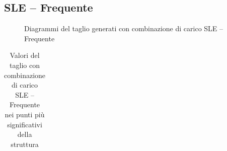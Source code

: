 \begin{landscape}
\subsection*{SLE -- Frequente}
\begin{figure}[H]
\centering
{} 
\caption{Diagrammi del taglio generati con combinazione di carico SLE -- Frequente}
\label{fig:Tagli_SLSfrequent}
\end{figure}
\begin{table}[H]
\centering
\caption{Valori del taglio con combinazione di carico SLE -- Frequente nei punti più significativi della struttura}
	\begin{tabular}{lS[table-format=3.2]S[table-format=3.2]S[table-format=3.2]S[table-format=3.2]S[table-format=3.2]S[table-format=3.2]S[table-format=3.2]S[table-format=3.2]S[table-format=3.2]S[table-format=3.2]S[table-format=3.2]S[table-format=3.2]S[table-format=3.2]}

\end{tabular}
\end{table}
\end{landscape}
